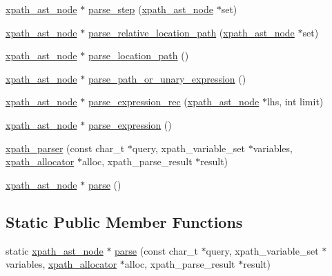 \begin{DoxyCompactItemize}
\item 
\hyperlink{classxpath__ast__node}{xpath\-\_\-ast\-\_\-node} $\ast$ \hyperlink{structxpath__parser_a7daf146822e199d8ad564be25daa49db}{parse\-\_\-step} (\hyperlink{classxpath__ast__node}{xpath\-\_\-ast\-\_\-node} $\ast$set)
\item 
\hyperlink{classxpath__ast__node}{xpath\-\_\-ast\-\_\-node} $\ast$ \hyperlink{structxpath__parser_ab50d8b75f78b7e2eb77a1cf6872daa00}{parse\-\_\-relative\-\_\-location\-\_\-path} (\hyperlink{classxpath__ast__node}{xpath\-\_\-ast\-\_\-node} $\ast$set)
\item 
\hyperlink{classxpath__ast__node}{xpath\-\_\-ast\-\_\-node} $\ast$ \hyperlink{structxpath__parser_aae61a2931ba0b0c713b5d043f1cef6d4}{parse\-\_\-location\-\_\-path} ()
\item 
\hyperlink{classxpath__ast__node}{xpath\-\_\-ast\-\_\-node} $\ast$ \hyperlink{structxpath__parser_a9f5cab421e931c46b0598ecec60c5591}{parse\-\_\-path\-\_\-or\-\_\-unary\-\_\-expression} ()
\item 
\hyperlink{classxpath__ast__node}{xpath\-\_\-ast\-\_\-node} $\ast$ \hyperlink{structxpath__parser_adfd2ab26b101a03ed79d7c3041539115}{parse\-\_\-expression\-\_\-rec} (\hyperlink{classxpath__ast__node}{xpath\-\_\-ast\-\_\-node} $\ast$lhs, int limit)
\item 
\hyperlink{classxpath__ast__node}{xpath\-\_\-ast\-\_\-node} $\ast$ \hyperlink{structxpath__parser_adb814ff3b99621d2a1c8e788ffd1c1c5}{parse\-\_\-expression} ()
\item 
\hyperlink{structxpath__parser_a3f5b4a04f4d0a0a44962d9825a86ed0d}{xpath\-\_\-parser} (const char\-\_\-t $\ast$query, xpath\-\_\-variable\-\_\-set $\ast$variables, \hyperlink{classxpath__allocator}{xpath\-\_\-allocator} $\ast$alloc, xpath\-\_\-parse\-\_\-result $\ast$result)
\item 
\hyperlink{classxpath__ast__node}{xpath\-\_\-ast\-\_\-node} $\ast$ \hyperlink{structxpath__parser_a581e576958037e1ab682fb952b3ada38}{parse} ()
\end{DoxyCompactItemize}
\subsection*{Static Public Member Functions}
\begin{DoxyCompactItemize}
\item 
static \hyperlink{classxpath__ast__node}{xpath\-\_\-ast\-\_\-node} $\ast$ \hyperlink{structxpath__parser_ab865a9a777b466365b3c4bd50290189d}{parse} (const char\-\_\-t $\ast$query, xpath\-\_\-variable\-\_\-set $\ast$variables, \hyperlink{classxpath__allocator}{xpath\-\_\-allocator} $\ast$alloc, xpath\-\_\-parse\-\_\-result $\ast$result)
\end{DoxyCompactItemize}
